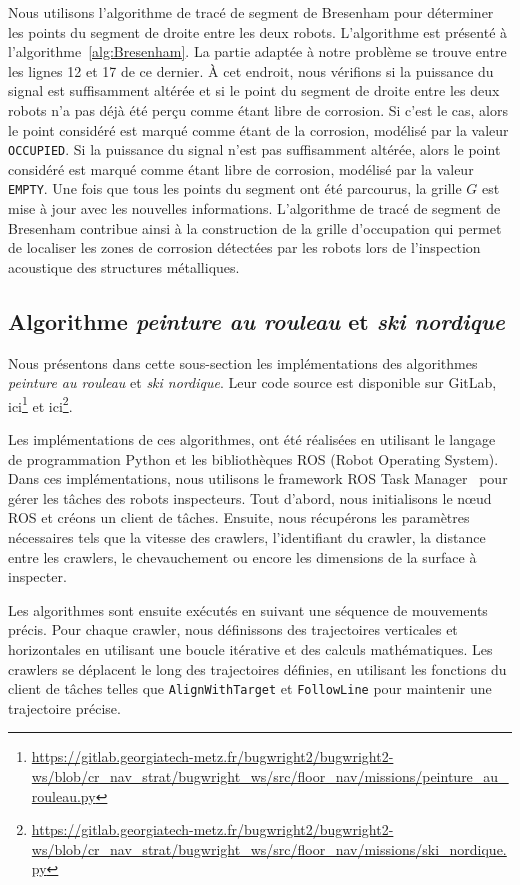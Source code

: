 \documentclass[english,RandD]{rapportPFE}  %
\begin{document}
			Nous utilisons l'algorithme de tracé de segment de Bresenham pour déterminer les points du segment de droite entre les deux robots.
			L'algorithme est présenté à l'algorithme~\ref{alg:Bresenham}.
			La partie adaptée à notre problème se trouve entre les lignes 12 et 17 de ce dernier.
			À cet endroit, nous vérifions si la puissance du signal est suffisamment altérée et si le point du segment de droite entre les deux robots n'a pas déjà été perçu comme étant libre de corrosion.
			Si c'est le cas, alors le point considéré est marqué comme étant de la corrosion, modélisé par la valeur \texttt{OCCUPIED}.
			Si la puissance du signal n'est pas suffisamment altérée, alors le point considéré est marqué comme étant libre de corrosion, modélisé par la valeur \texttt{EMPTY}.
			Une fois que tous les points du segment ont été parcourus, la grille $G$ est mise à jour avec les nouvelles informations.
			L'algorithme de tracé de segment de Bresenham contribue ainsi à la construction de la grille d'occupation qui permet de localiser les zones de corrosion détectées par les robots lors de l'inspection acoustique des structures métalliques.
		\subsection*{Algorithme \textit{peinture au rouleau} et \textit{ski nordique}}
			Nous présentons dans cette sous-section les implémentations des algorithmes \textit{peinture au rouleau} et \textit{ski nordique}.
			Leur code source est disponible sur GitLab, ici\footnote{\url{https://gitlab.georgiatech-metz.fr/bugwright2/bugwright2-ws/blob/cr_nav_strat/bugwright_ws/src/floor_nav/missions/peinture_au_rouleau.py}} et ici\footnote{\url{https://gitlab.georgiatech-metz.fr/bugwright2/bugwright2-ws/blob/cr_nav_strat/bugwright_ws/src/floor_nav/missions/ski_nordique.py}}.

			Les implémentations de ces algorithmes, ont été réalisées en utilisant le langage de programmation Python et les bibliothèques ROS (Robot Operating System).
			Dans ces implémentations, nous utilisons le framework ROS Task Manager~\cite{ROSTaskManager} pour gérer les tâches des robots inspecteurs.
			Tout d'abord, nous initialisons le nœud ROS et créons un client de tâches.
			Ensuite, nous récupérons les paramètres nécessaires tels que la vitesse des crawlers, l'identifiant du crawler, la distance entre les crawlers, le chevauchement ou encore les dimensions de la surface à inspecter.

			Les algorithmes sont ensuite exécutés en suivant une séquence de mouvements précis.
			Pour chaque crawler, nous définissons des trajectoires verticales et horizontales en utilisant une boucle itérative et des calculs mathématiques. Les crawlers se déplacent le long des trajectoires définies, en utilisant les fonctions du client de tâches telles que \texttt{AlignWithTarget} et \texttt{FollowLine} pour maintenir une trajectoire précise.
\end{document}
